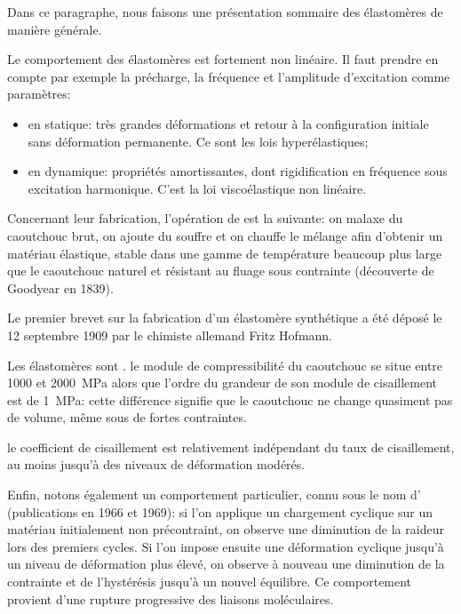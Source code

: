 Dans ce paragraphe, nous faisons une présentation sommaire des élastomères de manière
générale.

\medskip
Le comportement des élastomères est fortement non linéaire. Il faut prendre en compte par exemple la précharge, la fréquence et l'amplitude d'excitation comme paramètres:
\begin{itemize}
	\item en statique: très grandes déformations et retour à la configuration
		initiale sans déformation permanente. Ce sont les lois hyperélastiques;
	\item en dynamique: propriétés amortissantes, dont rigidification en fréquence
		sous excitation harmonique. C'est la loi viscoélastique non linéaire.
\end{itemize}

\medskip
Concernant leur fabrication, l'opération de  est la suivante: on malaxe du caoutchouc brut, on ajoute du souffre et on chauffe le mélange afin d'obtenir un matériau élastique, stable dans une gamme de température beaucoup plus large que le caoutchouc naturel et résistant au fluage sous contrainte (découverte de Goodyear en 1839).

Le premier brevet sur la fabrication d'un élastomère synthétique a été déposé le 12 septembre 1909 par le chimiste allemand Fritz Hofmann.

\medskip
Les élastomères sont . le module de compressibilité du caoutchouc se situe entre 1000 et 2000~MPa alors que l'ordre du grandeur de son module de cisaillement est de 1~MPa: cette différence signifie que le caoutchouc ne change quasiment pas de volume, même sous de fortes contraintes.

\medskip
{} le coefficient de cisaillement est relativement indépendant du taux de cisaillement, au moins jusqu'à des niveaux de déformation modérés.

\medskip
Enfin, notons également un comportement particulier, connu sous le nom d' (publications en 1966 et 1969): si l'on applique un chargement cyclique sur un matériau initialement non précontraint, on observe une diminution de la raideur lors des premiers cycles. Si l'on impose ensuite une déformation cyclique jusqu'à un niveau de déformation plus élevé, on observe à nouveau une diminution de la contrainte et de l'hystérésis jusqu'à un nouvel équilibre. Ce comportement provient d'une rupture progressive des liaisons moléculaires.


